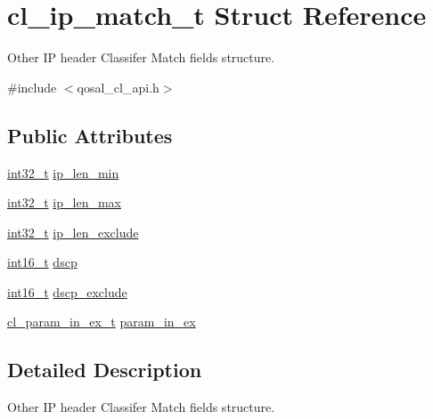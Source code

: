 \hypertarget{structcl__ip__match__t}{\section{cl\-\_\-ip\-\_\-match\-\_\-t Struct Reference}
\label{structcl__ip__match__t}
}


Other I\-P header Classifer Match fields structure.  




{\ttfamily \#include $<$qosal\-\_\-cl\-\_\-api.\-h$>$}

\subsection*{Public Attributes}
\begin{DoxyCompactItemize}
\item 
\hyperlink{commondefs_8h_a32f2e37ee053cf2ce8ca28d1f74630e5}{int32\-\_\-t} \hyperlink{structcl__ip__match__t_ac792bdfd358aa3ecab74480f1450c1de}{ip\-\_\-len\-\_\-min}
\item 
\hyperlink{commondefs_8h_a32f2e37ee053cf2ce8ca28d1f74630e5}{int32\-\_\-t} \hyperlink{structcl__ip__match__t_a9e6b353f8e7197418b45fc8919274fd1}{ip\-\_\-len\-\_\-max}
\item 
\hyperlink{commondefs_8h_a32f2e37ee053cf2ce8ca28d1f74630e5}{int32\-\_\-t} \hyperlink{structcl__ip__match__t_af364a011fad74c921876d09c9a90ab0e}{ip\-\_\-len\-\_\-exclude}
\item 
\hyperlink{commondefs_8h_a66634143db08bebe9b46ab4cb1fc6fd3}{int16\-\_\-t} \hyperlink{structcl__ip__match__t_a247b29f7d57aa14541706a62956b59bd}{dscp}
\item 
\hyperlink{commondefs_8h_a66634143db08bebe9b46ab4cb1fc6fd3}{int16\-\_\-t} \hyperlink{structcl__ip__match__t_a6b4e31b2beef845d8b44101df073c41b}{dscp\-\_\-exclude}
\item 
\hyperlink{structcl__param__in__ex__t}{cl\-\_\-param\-\_\-in\-\_\-ex\-\_\-t} \hyperlink{structcl__ip__match__t_a1d1364036356ddfe8731f777c02f186d}{param\-\_\-in\-\_\-ex}
\end{DoxyCompactItemize}


\subsection{Detailed Description}
Other I\-P header Classifer Match fields structure. 


